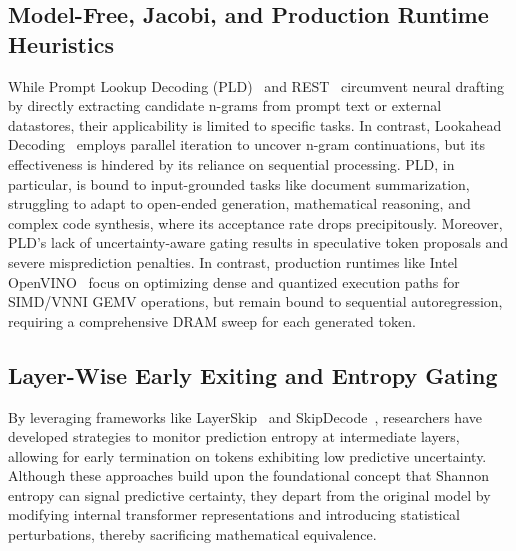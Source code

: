 \documentclass[journal,10pt,twocolumn]{article}
\theoremstyle{definition}
\begin{document}
\subsection{Model-Free, Jacobi, and Production Runtime Heuristics}
While Prompt Lookup Decoding (PLD)~\cite{saxena2023pld} and REST~\cite{he2024rest} circumvent neural drafting by directly extracting candidate n-grams from prompt text or external datastores, their applicability is limited to specific tasks. In contrast, Lookahead Decoding~\cite{fu2024lookahead} employs parallel iteration to uncover n-gram continuations, but its effectiveness is hindered by its reliance on sequential processing. PLD, in particular, is bound to input-grounded tasks like document summarization, struggling to adapt to open-ended generation, mathematical reasoning, and complex code synthesis, where its acceptance rate drops precipitously. Moreover, PLD's lack of uncertainty-aware gating results in speculative token proposals and severe misprediction penalties. In contrast, production runtimes like Intel OpenVINO~\cite{openvino} focus on optimizing dense and quantized execution paths for SIMD/VNNI GEMV operations, but remain bound to sequential autoregression, requiring a comprehensive DRAM sweep for each generated token.

\subsection{Layer-Wise Early Exiting and Entropy Gating}
By leveraging frameworks like LayerSkip~\cite{elhoushi2024layerskip} and SkipDecode~\cite{delcorro2023skipdecode}, researchers have developed strategies to monitor prediction entropy at intermediate layers, allowing for early termination on tokens exhibiting low predictive uncertainty. Although these approaches build upon the foundational concept that Shannon entropy can signal predictive certainty, they depart from the original model by modifying internal transformer representations and introducing statistical perturbations, thereby sacrificing mathematical equivalence.
\end{document}
